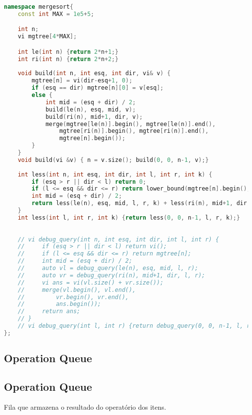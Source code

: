 \documentclass[11pt, a4paper, twoside]{article}
\begin{document}
\begin{lstlisting}[language=C++]
namespace mergesort{
    const int MAX = 1e5+5;

    int n;
    vi mgtree[4*MAX];

    int le(int n) {return 2*n+1;}
    int ri(int n) {return 2*n+2;}
    
    void build(int n, int esq, int dir, vi& v) {
        mgtree[n] = vi(dir-esq+1, 0);
        if (esq == dir) mgtree[n][0] = v[esq];
        else {
            int mid = (esq + dir) / 2;
            build(le(n), esq, mid, v);
            build(ri(n), mid+1, dir, v);
            merge(mgtree[le(n)].begin(), mgtree[le(n)].end(),
                mgtree[ri(n)].begin(), mgtree[ri(n)].end(),
                mgtree[n].begin());
        }
    }
    void build(vi &v) { n = v.size(); build(0, 0, n-1, v);}
    
    int less(int n, int esq, int dir, int l, int r, int k) {
        if (esq > r || dir < l) return 0;
        if (l <= esq && dir <= r) return lower_bound(mgtree[n].begin(), mgtree[n].end(), k) - mgtree[n].begin();
        int mid = (esq + dir) / 2;
        return less(le(n), esq, mid, l, r, k) + less(ri(n), mid+1, dir, l, r, k);
    }
    int less(int l, int r, int k) {return less(0, 0, n-1, l, r, k);}
        
    
    // vi debug_query(int n, int esq, int dir, int l, int r) {
    //     if (esq > r || dir < l) return vi();
    //     if (l <= esq && dir <= r) return mgtree[n];
    //     int mid = (esq + dir) / 2;
    //     auto vl = debug_query(le(n), esq, mid, l, r);
    //     auto vr = debug_query(ri(n), mid+1, dir, l, r);
    //     vi ans = vi(vl.size() + vr.size());
    //     merge(vl.begin(), vl.end(),
    //         vr.begin(), vr.end(),
    //         ans.begin());
    //     return ans;
    // }
    // vi debug_query(int l, int r) {return debug_query(0, 0, n-1, l, r);}  
};
\end{lstlisting}

\subsection{Operation Queue}

\subsection{Operation Queue}



Fila que armazena o resultado do operatório dos itens.
\end{document}
